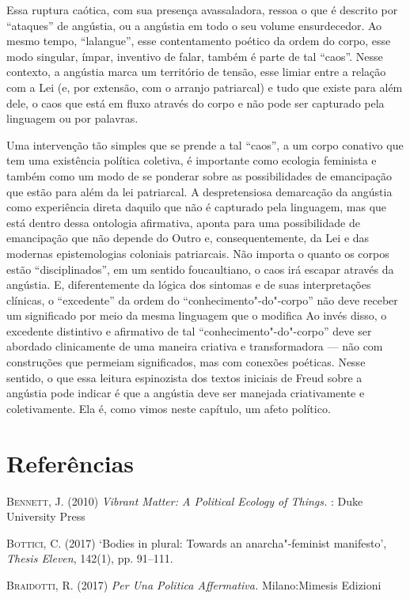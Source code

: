 Essa ruptura caótica, com sua presença avassaladora, ressoa o que é
descrito por ``ataques'' de angústia, ou a angústia em todo o seu volume
ensurdecedor. Ao mesmo tempo, ``lalangue'', esse contentamento poético
da ordem do corpo, esse modo singular, ímpar, inventivo de falar, também
é parte de tal ``caos''. Nesse contexto, a angústia marca um território
de tensão, esse limiar entre a relação com a Lei (e, por extensão, com o
arranjo patriarcal) e tudo que existe para além dele, o caos que está em
fluxo através do corpo e não pode ser capturado pela linguagem ou por
palavras.

Uma intervenção tão simples que se prende a tal ``caos'', a um corpo
conativo que tem uma existência política coletiva, é importante como
ecologia feminista e também como um modo de se ponderar sobre as
possibilidades de emancipação que estão para além da lei patriarcal. A
despretensiosa demarcação da angústia como experiência direta daquilo
que não é capturado pela linguagem, mas que está dentro dessa ontologia
afirmativa, aponta para uma possibilidade de emancipação que não depende
do Outro e, consequentemente, da Lei e das modernas epistemologias
coloniais patriarcais. Não importa o quanto os corpos estão
``disciplinados'', em um sentido foucaultiano, o caos irá escapar
através da angústia. E, diferentemente da lógica dos sintomas e de suas
interpretações clínicas, o ``excedente'' da ordem do
``conhecimento"-do"-corpo'' não deve receber um significado por meio da
mesma linguagem que o modifica Ao invés disso, o excedente distintivo e
afirmativo de tal ``conhecimento"-do"-corpo'' deve ser abordado
clinicamente de uma maneira criativa e transformadora --- não com
construções que permeiam significados, mas com conexões poéticas. Nesse
sentido, o que essa leitura espinozista dos textos iniciais de Freud
sobre a angústia pode indicar é que a angústia deve ser manejada
criativamente e coletivamente. Ela é, como vimos neste capítulo, um
afeto político.

\section{Referências}

\textsc{Bennett}, J. (2010) \emph{Vibrant
Matter: A Political Ecology of Things.} : Duke University Press

\textsc{Bottici}, C. (2017) `Bodies in plural: Towards an anarcha"-feminist
manifesto', \emph{Thesis Eleven}, 142(1), pp. 91--111.

\textsc{Braidotti}, R. (2017) \emph{Per Una Politica Affermativa.} Milano:Mimesis
Edizioni

